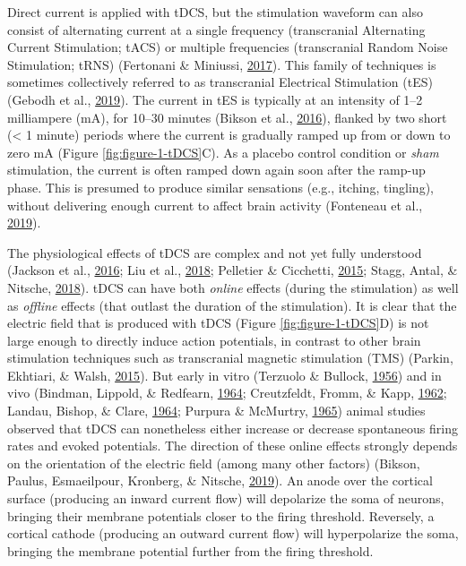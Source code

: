 \documentclass[12pt,a4paper,]{memoir}
\begin{document}
Direct current is applied with tDCS, but the stimulation waveform can also consist of alternating current at a single frequency (transcranial Alternating Current Stimulation; tACS) or multiple frequencies (transcranial Random Noise Stimulation; tRNS) (Fertonani \& Miniussi, \protect\hyperlink{ref-Fertonani2017}{2017}). This family of techniques is sometimes collectively referred to as transcranial Electrical Stimulation (tES) (Gebodh et al., \protect\hyperlink{ref-Gebodh2019a}{2019}). The current in tES is typically at an intensity of 1--2 milliampere (mA), for 10--30 minutes (Bikson et al., \protect\hyperlink{ref-Bikson2016}{2016}), flanked by two short (\textless{} 1 minute) periods where the current is gradually ramped up from or down to zero mA (Figure \ref{fig:figure-1-tDCS}C). As a placebo control condition or \emph{sham} stimulation, the current is often ramped down again soon after the ramp-up phase. This is presumed to produce similar sensations (e.g., itching, tingling), without delivering enough current to affect brain activity (Fonteneau et al., \protect\hyperlink{ref-Fonteneau2019}{2019}).

The physiological effects of tDCS are complex and not yet fully understood (Jackson et al., \protect\hyperlink{ref-Jackson2016}{2016}; Liu et al., \protect\hyperlink{ref-Liu2018}{2018}; Pelletier \& Cicchetti, \protect\hyperlink{ref-Pelletier2015}{2015}; Stagg, Antal, \& Nitsche, \protect\hyperlink{ref-Stagg2018}{2018}). tDCS can have both \emph{online} effects (during the stimulation) as well as \emph{offline} effects (that outlast the duration of the stimulation). It is clear that the electric field that is produced with tDCS (Figure \ref{fig:figure-1-tDCS}D) is not large enough to directly induce action potentials, in contrast to other brain stimulation techniques such as transcranial magnetic stimulation (TMS) (Parkin, Ekhtiari, \& Walsh, \protect\hyperlink{ref-Parkin2015}{2015}). But early in vitro (Terzuolo \& Bullock, \protect\hyperlink{ref-Terzuolo1956}{1956}) and in vivo (Bindman, Lippold, \& Redfearn, \protect\hyperlink{ref-Bindman1964}{1964}; Creutzfeldt, Fromm, \& Kapp, \protect\hyperlink{ref-Creutzfeldt1962}{1962}; Landau, Bishop, \& Clare, \protect\hyperlink{ref-Landau1964}{1964}; Purpura \& McMurtry, \protect\hyperlink{ref-Purpura1965}{1965}) animal studies observed that tDCS can nonetheless either increase or decrease spontaneous firing rates and evoked potentials. The direction of these online effects strongly depends on the orientation of the electric field (among many other factors) (Bikson, Paulus, Esmaeilpour, Kronberg, \& Nitsche, \protect\hyperlink{ref-Bikson2019}{2019}). An anode over the cortical surface (producing an inward current flow) will depolarize the soma of neurons, bringing their membrane potentials closer to the firing threshold. Reversely, a cortical cathode (producing an outward current flow) will hyperpolarize the soma, bringing the membrane potential further from the firing threshold.
\end{document}
